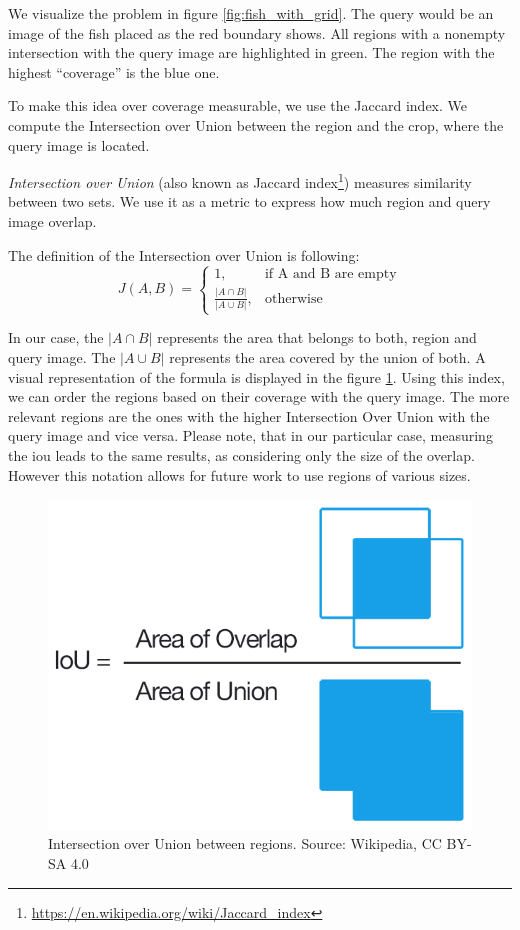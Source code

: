 We visualize the problem in figure \ref{fig:fish_with_grid}. The query would be an image of the fish placed as the red boundary shows. All regions with a nonempty intersection with the query image are highlighted in green. The region with the highest ``coverage'' is the blue one.

To make this idea over coverage measurable, we use the Jaccard index. We compute the Intersection over Union between the region and the crop, where the query image is located. 

\emph{Intersection over Union} (also known as Jaccard index\footnote{\href{https://en.wikipedia.org/wiki/Jaccard_index}{https://en.wikipedia.org/wiki/Jaccard\_index}}) measures similarity between two sets. We use it as a metric to express how much region and query image overlap. 

The definition of the Intersection over Union is following:
$$
    J(A, B) = 
    \begin{cases}
      1, & \text{if\ A and B are empty} \\
      \frac{|A \cap B|}{|A \cup B|}, & \text{otherwise}
    \end{cases}
$$

In our case, the $|A \cap B|$ represents the area that belongs to both, region and query image. The  $|A \cup B|$ represents the area covered by the union of both. A visual representation of the formula is displayed in the figure \ref{fig:intersection_over_union}. Using this index, we can order the regions based on their coverage with the query image. The more relevant regions are the ones with the higher Intersection Over Union with the query image and vice versa. Please note, that in our particular case, measuring the \acrshort{iou} leads to the same results, as considering only the size of the overlap. However this notation allows for future work to use regions of various sizes.

\begin{figure}
    \centering
	\includegraphics[width=0.4\linewidth]{img/Intersection_over_Union_-_visual_equation.png}
	\caption{Intersection over Union between regions. Source: Wikipedia, CC BY-SA 4.0}
	\label{fig:intersection_over_union}
\end{figure}

